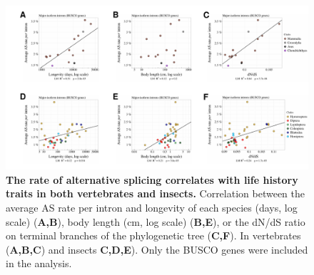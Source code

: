 \begin{figure}[t]   
    \begin{center}                                                                       
        \includegraphics[width=\textwidth] {Figure4_supp.pdf}
    \end{center}                                                                       
    \caption[The rate of alternative splicing correlates with life history traits in both vertebrates and insects]{
     \textbf{The rate of alternative splicing correlates with life history traits in both vertebrates and insects.} Correlation between the average AS rate per intron and longevity of each species (days, log scale) (\textbf{A,B}), body length (cm, log scale) (\textbf{B,E}), or the dN/dS ratio on terminal branches of the phylogenetic tree (\textbf{C,F}). In vertebrates (\textbf{A,B,C}) and insects 
 \textbf{C,D,E}). Only the BUSCO genes were included in the analysis.}
    \label{supp_fig:AS4}
\end{figure}


